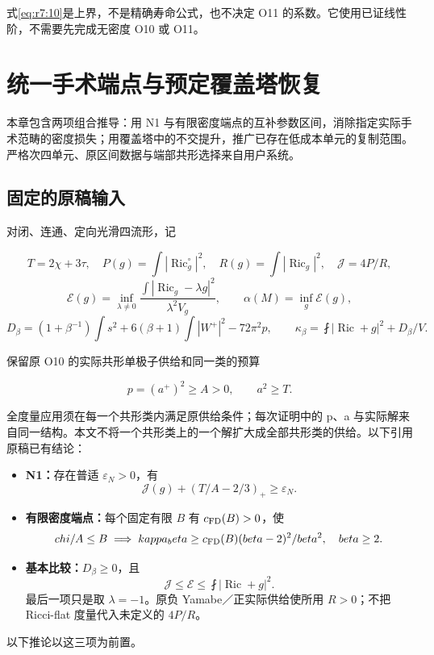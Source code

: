 \documentclass[UTF8,11pt,openany,oneside,fontset=none]{ctexbook}
\providecommand{\tightlist}{\setlength{\itemsep}{1pt}\setlength{\parskip}{0pt}}
\begin{document}
式\eqref{eq:r7:10}是上界，不是精确寿命公式，也不决定 O11 的系数。它使用已证线性阶，不需要先完成无密度 O10 或 O11。


\chapter{统一手术端点与预定覆盖塔恢复}\label{chapter:8}
本章包含两项组合推导：用 N1 与有限密度端点的互补参数区间，消除指定实际手术范畴的密度损失；用覆盖塔中的不交提升，推广已存在低成本单元的复制范围。严格次四单元、原区间数据与端部共形选择来自用户系统。\cite{R08,N1,FD,System,Conformal}

\section{固定的原稿输入}\label{ch8:ux56faux5b9aux7684ux539fux7a3fux8f93ux5165}

对闭、连通、定向光滑四流形，记

\[
T=2\chi+3\tau,\quad
P(g)=\int|\operatorname{Ric}^{\circ}_g|^2,\quad
R(g)=\int|\operatorname{Ric}_g|^2,
\quad\mathcal J=4P/R,
\] \[
\mathcal E(g)=\inf_{\lambda\ne0}
\frac{\int|\operatorname{Ric}_g-\lambda g|^2}{\lambda^2V_g},
\qquad \alpha(M)=\inf_g\mathcal E(g),
\] \[
D_\beta=(1+\beta^{-1})\int s^2
+6(\beta+1)\int|W^+|^2-72\pi^2p,
\qquad
\kappa_\beta=\fint|\operatorname{Ric}+g|^2+D_\beta/V.
\]

保留原 O10 的实际共形单极子供给和同一类的预算

\[
p=(a^+)^2\ge A>0,\qquad a^2\ge T.
\]

全度量应用须在每一个共形类内满足原供给条件；每次证明中的 p、a 与实际解来自同一结构。本文不将一个共形类上的一个解扩大成全部共形类的供给。以下引用原稿已有结论：

\begin{itemize}
\tightlist
\item
  \textbf{N1：}存在普适 \(\varepsilon_N>0\)，有 \[
  \mathcal J(g)+(T/A-2/3)_+\ge\varepsilon_N.
  \]
\item
  \textbf{有限密度端点：}每个固定有限 \(B\) 有 \(c_{\rm FD}(B)>0\)，使 \[
  \chi/A\le B\implies
  \kappa_\beta\ge c_{\rm FD}(B)(\beta-2)^2/\beta^2,
  \quad\beta\ge2.
  \]
\item
  \textbf{基本比较：}\(D_\beta\ge0\)，且 \[
  \mathcal J\le\mathcal E\le\fint|\operatorname{Ric}+g|^2.
  \] 最后一项只是取 \(\lambda=-1\)。原负 Yamabe／正实际供给使所用 \(R>0\)；不把 Ricci-flat 度量代入未定义的 \(4P/R\)。
\end{itemize}

以下推论以这三项为前置。
\end{document}
